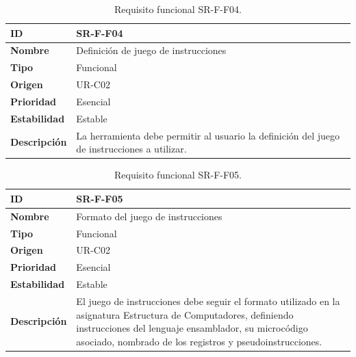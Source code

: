 \begin{center}
\begin{table}[htbp]
\centering
\caption{Requisito funcional SR-F-F04.}
\begin{tabular}{@{}p{2.5cm} p{9cm}@{}} 
\toprule
\textbf{ID} 				& SR-F-F04 \\
\midrule
\textbf{Nombre} 			& Definición de juego de instrucciones \\
\midrule
\textbf{Tipo} 			& Funcional \\
\midrule
\textbf{Origen} 			& UR-C02 \\
\midrule
\textbf{Prioridad}		& Esencial \\
\midrule
\textbf{Estabilidad} 		& Estable \\
\midrule
\textbf{Descripción} 	& La herramienta debe permitir al usuario la definición del juego de instrucciones a utilizar.\\
\bottomrule
\end{tabular}
\label{tab:srff04}
\end{table}
\end{center}

\begin{center}
\begin{table}[htbp]
\centering
\caption{Requisito funcional SR-F-F05.}
\begin{tabular}{@{}p{2.5cm} p{9cm}@{}} 
\toprule
\textbf{ID} 				& SR-F-F05 \\
\midrule
\textbf{Nombre} 			& Formato del juego de instrucciones\\
\midrule
\textbf{Tipo} 			& Funcional \\
\midrule
\textbf{Origen} 			& UR-C02 \\
\midrule
\textbf{Prioridad}		& Esencial \\
\midrule
\textbf{Estabilidad} 		& Estable \\
\midrule
\textbf{Descripción} 	& El juego de instrucciones debe seguir el formato utilizado en la asignatura Estructura de Computadores, definiendo instrucciones del lenguaje ensamblador, su microcódigo asociado, nombrado de los registros y pseudoinstrucciones. \\
\bottomrule
\end{tabular}
\label{tab:srff05}
\end{table}
\end{center}


